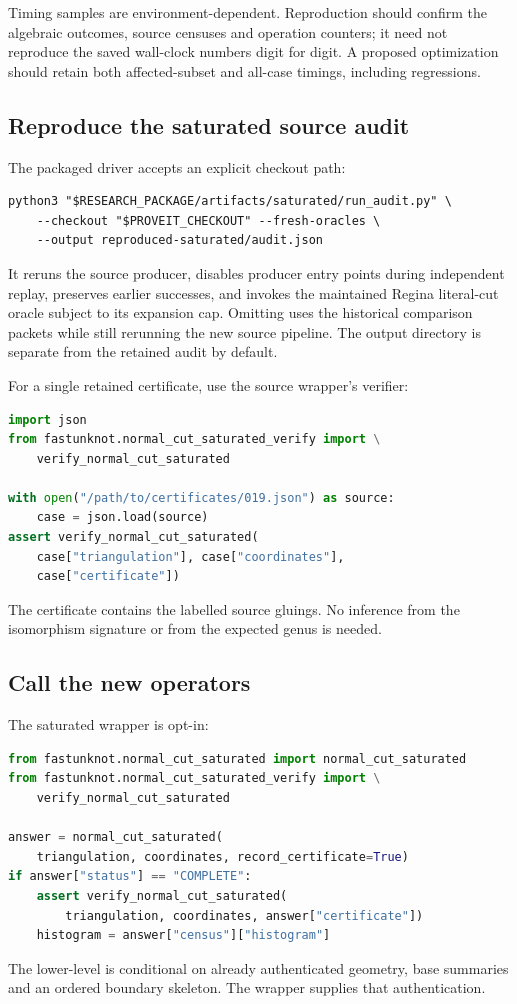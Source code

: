 Timing samples are environment-dependent. Reproduction should confirm
the algebraic outcomes, source censuses and operation counters; it need
not reproduce the saved wall-clock numbers digit for digit. A proposed
optimization should retain both affected-subset and all-case timings,
including regressions.

\subsection{Reproduce the saturated source audit}

The packaged driver accepts an explicit checkout path:
\begin{lstlisting}
python3 "$RESEARCH_PACKAGE/artifacts/saturated/run_audit.py" \
    --checkout "$PROVEIT_CHECKOUT" --fresh-oracles \
    --output reproduced-saturated/audit.json
\end{lstlisting}
It reruns the source producer, disables producer entry points during
independent replay, preserves earlier successes, and invokes the
maintained Regina literal-cut oracle subject to its expansion cap.
Omitting \code{--fresh-oracles} uses the historical comparison packets
while still rerunning the new source pipeline. The output directory is
separate from the retained audit by default.

For a single retained certificate, use the source wrapper's verifier:
\begin{lstlisting}[language=Python]
import json
from fastunknot.normal_cut_saturated_verify import \
    verify_normal_cut_saturated

with open("/path/to/certificates/019.json") as source:
    case = json.load(source)
assert verify_normal_cut_saturated(
    case["triangulation"], case["coordinates"],
    case["certificate"])
\end{lstlisting}
The certificate contains the labelled source gluings. No inference from
the isomorphism signature or from the expected genus is needed.

\Needspace{13\baselineskip}
\subsection{Call the new operators}

The saturated wrapper is opt-in:
\begin{lstlisting}[language=Python]
from fastunknot.normal_cut_saturated import normal_cut_saturated
from fastunknot.normal_cut_saturated_verify import \
    verify_normal_cut_saturated

answer = normal_cut_saturated(
    triangulation, coordinates, record_certificate=True)
if answer["status"] == "COMPLETE":
    assert verify_normal_cut_saturated(
        triangulation, coordinates, answer["certificate"])
    histogram = answer["census"]["histogram"]
\end{lstlisting}
The lower-level  is conditional on
already authenticated geometry, base summaries and an ordered boundary
skeleton. The wrapper supplies that authentication.

